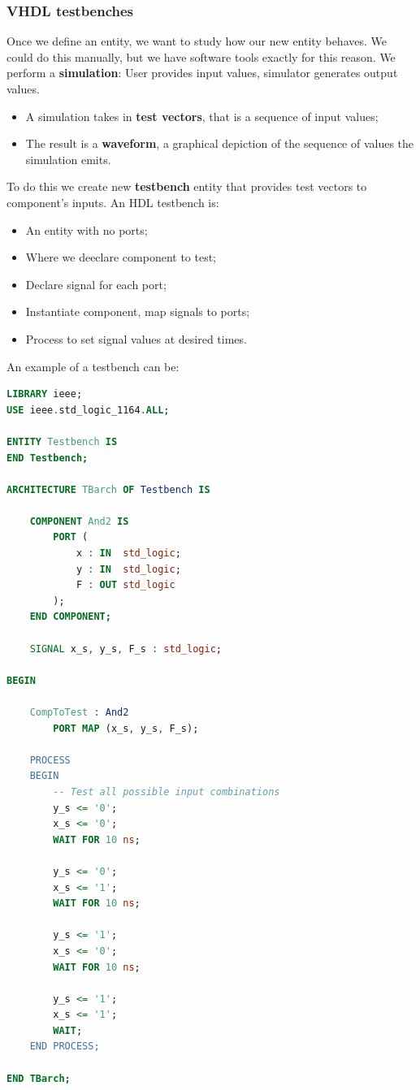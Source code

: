 \documentclass[a4paper,11pt]{article}
\begin{document}
\subsubsection{VHDL testbenches}

Once we define an entity, we want to study how our new entity behaves.
We could do this manually, but we have software tools exactly for this reason.
We perform a \textbf{simulation}: User provides input values, simulator generates output values.
\begin{itemize}
	\item A simulation takes in \textbf{test vectors}, that is a sequence of input values;
	\item The result is a \textbf{waveform}, a graphical depiction of the sequence of values the simulation emits.
\end{itemize}

To do this we create new \textbf{testbench} entity that provides test vectors to component's inputs.
An HDL testbench is:
\begin{itemize}
	\item An entity with no ports;
	\item Where we deeclare component to test;
	\item Declare signal for each port;
	\item Instantiate component, map signals to ports;
	\item Process to set signal values at desired times.
\end{itemize}

An example of a testbench can be:
\begin{lstlisting}[language=VHDL, style=codestyle]	
LIBRARY ieee;
USE ieee.std_logic_1164.ALL;

ENTITY Testbench IS
END Testbench;

ARCHITECTURE TBarch OF Testbench IS

    COMPONENT And2 IS
        PORT (
            x : IN  std_logic;
            y : IN  std_logic;
            F : OUT std_logic
        );
    END COMPONENT;

    SIGNAL x_s, y_s, F_s : std_logic;

BEGIN

    CompToTest : And2
        PORT MAP (x_s, y_s, F_s);

    PROCESS
    BEGIN
        -- Test all possible input combinations
        y_s <= '0';
        x_s <= '0';
        WAIT FOR 10 ns;

        y_s <= '0';
        x_s <= '1';
        WAIT FOR 10 ns;

        y_s <= '1';
        x_s <= '0';
        WAIT FOR 10 ns;

        y_s <= '1';
        x_s <= '1';
        WAIT;
    END PROCESS;

END TBarch;
\end{lstlisting}
\end{document}

